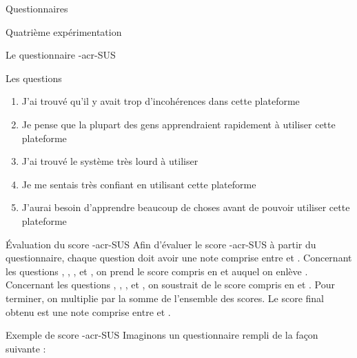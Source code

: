 \documentclass[myfrancais,ngerman,english,french]{mythesis}
\begin{document}
\begin{mychapter}{Questionnaires}
\begin{mysection}{Quatrième expérimentation}
\begin{mysubsection}{Le questionnaire \myacronl-{acr-SUS}}
\begin{mysubsubsection}{Les questions}
\begin{enumerate}[label={Q\arabic*.},ref={Q\arabic*}]
						\item J'ai trouvé qu'il y avait trop d'incohérences dans cette plateforme
						\item Je pense que la plupart des gens apprendraient rapidement à utiliser cette plateforme
						\item J'ai trouvé le système très lourd à utiliser
						\item Je me sentais très confiant en utilisant cette plateforme
						\item J'aurai besoin d'apprendre beaucoup de choses avant de pouvoir utiliser cette plateforme
					\end{enumerate}
				\end{mysubsubsection}
				\begin{mysubsubsection}{Évaluation du score \myacronl-{acr-SUS}}
					Afin d'évaluer le score \myacro-{acr-SUS} à partir du questionnaire, chaque question doit avoir une note comprise entre  et .
					Concernant les questions , , ,  et , on prend le score compris en  et  auquel on enlève .
					Concernant les questions , , ,  et , on soustrait de  le score compris en  et .
					Pour terminer, on multiplie par  la somme de l'ensemble des scores.
					Le score final obtenu est une note comprise entre  et .
				\end{mysubsubsection}
				\begin{mysubsubsection}{Exemple de score \myacronl-{acr-SUS}}
					Imaginons un questionnaire rempli de la façon suivante :
					\newcommand{\mySUSplus}[1]{%
						\fpRegSet{mySUSplus}{1}
						\fpRegSet{myscore}{#1}%
						\fpRegSub{myscore}{mySUSplus}%
						\fpRegRound{myscore}{0}%
						\fpRegGet{myscore}{\myscore}%
						réponse \textcolor{mygreen}{\mynum{#1}} $\Rightarrow$ score $\textcolor{mygreen}{\mynum{#1}} - 1 = \textcolor{myred}{\mynum{\myscore}}$%
					}
					\newcommand{\mySUSminus}[1]{%
						\fpRegSet{mylevel}{5}
						\fpRegSet{myscore}{#1}
						\fpRegSub{mylevel}{myscore}%
						\fpRegRound{mylevel}{0}%
						\fpRegGet{mylevel}{\myscore}%
						réponse \textcolor{mygreen}{\mynum{#1}} $\Rightarrow$ score $5 - \textcolor{mygreen}{\mynum{#1}} = \textcolor{myred}{\mynum{\myscore}}$%
					}
					\begin{enumerate}[label={Q\arabic*.},ref={Q\arabic*}]

\end{enumerate}
\end{mysubsubsection}
\end{mysubsection}
\end{mysection}
\end{mychapter}
\end{document}
